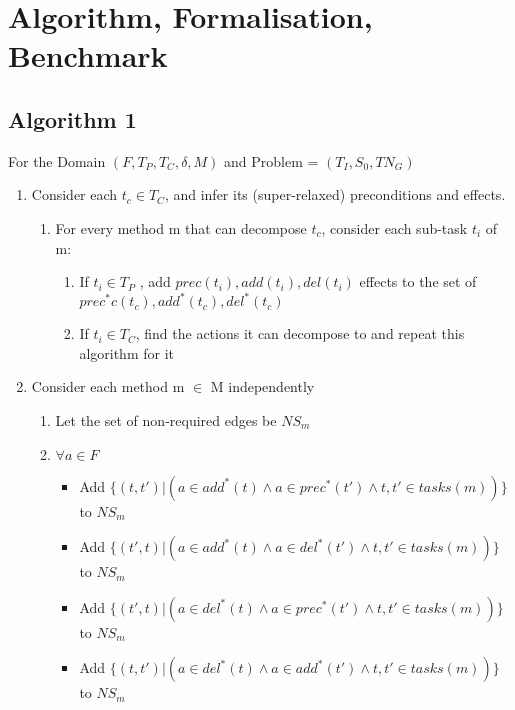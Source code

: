\chapter{Algorithm, Formalisation, Benchmark}\label{chap:content}

\section{Algorithm 1}
For the Domain $(F, T_P, T_C, \delta, M)$ and Problem = $(T_I, S_0, TN_G)$
\begin{enumerate}
\item Consider each $t_c \in T_C$, and infer its (super-relaxed) preconditions and effects.
	\begin{enumerate}
	\item For every method m that can decompose $t_c$, consider each sub-task $t_i$ of m:
	\begin{enumerate}
		\item If $t_i \in T_P$ , add $prec(t_i), add(t_i), del(t_i)$ effects to the set of $prec^{*}c(t_c), add^{*}(t_c), del^{*}(t_c)$
		\item If $t_i \in T_C$, find the actions it can decompose to and repeat this algorithm for it
		\end{enumerate}
	\end{enumerate}
\item Consider each method m $\in$ M independently
	\begin{enumerate}	
		\item Let the set of non-required edges be $NS_m$
		\item $\forall a \in F$
		\begin{itemize}			
			\item Add $\{ (t, t') |  (a \in add^{*}(t) \land a \in prec^{*}(t') \land t, t' \in tasks(m) ) \}$ to $NS_m$ 
			\item Add $\{ (t', t) |  (a \in add^{*}(t) \land a \in del^{*}(t') \land t, t' \in tasks(m) ) \}$ to $NS_m$ 
			\item Add $\{ (t', t) |  (a \in del^{*}(t) \land a \in prec^{*}(t') \land t, t' \in tasks(m) ) \}$ to $NS_m$ 
			\item Add $\{ (t, t') |  (a \in del^{*}(t) \land a \in add^{*}(t') \land t, t' \in tasks(m) ) \}$ to $NS_m$ 

\end{itemize}
\end{enumerate}
\end{enumerate}
